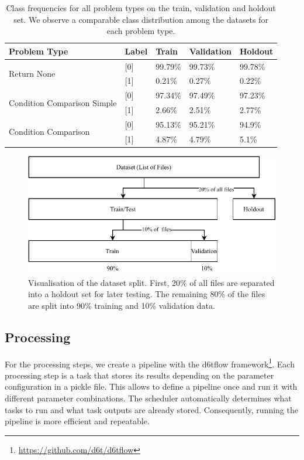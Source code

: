 \begin{table}[]
    \begin{tabularx}{\textwidth}{@{}lXXXX@{}}
    \toprule
    Problem Type                                 & Label& Train & Validation & Holdout \\ \midrule 
    \multirow{2}{*}{Return None}                 & [0] & 99.79\%  & 99.73\% & 99.78\%  \\
                                                 & [1] & 0.21\%   & 0.27\%  & 0.22\%    \\ \midrule
    \multirow{2}{*}{Condition Comparison Simple} & [0] & 97.34\%   &  97.49\%  & 97.23\%  \\
                                                 & [1] & 2.66\%   & 2.51\% & 2.77\%    \\ \midrule
    \multirow{2}{*}{Condition Comparison}        & [0] & 95.13\%  & 95.21\%  & 94.9\%  \\
                                                 & [1] & 4.87\%   & 4.79\%  & 5.1\%    \\ \bottomrule
    \end{tabularx}
    \caption{Class frequencies for all problem types on the train, validation and holdout set. We observe a comparable class distribution among the datasets for each problem type.}
    \label{tab:class_distribution}
\end{table}


\begin{figure}
    \includegraphics[width=1\textwidth]{img/ML/Data_split.pdf}
    \caption{Visualisation of the dataset split. First, 20\% of all files are separated into a holdout set for later testing. The remaining 80\% of the files are split into 90\% training and 10\% validation data. }
    \label{fig:data_split}
\end{figure}

\subsection{Processing}
For the processing steps, we create a pipeline with the d6tflow framework\footnote{\url{https://github.com/d6t/d6tflow}}. Each processing step is a task that stores its results depending on the parameter configuration in a pickle file. This allows to define a pipeline once and run it with different parameter combinations. The scheduler automatically determines what tasks to run and what task outputs are already stored. Consequently, running the pipeline is more efficient and repeatable.

